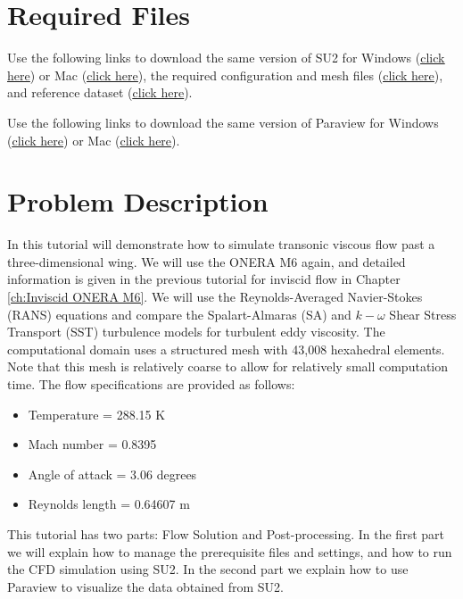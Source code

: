 \section{Required Files}
\begin{su2note}
	Use the following links to download the same version of SU2 for Windows (\href{https://users.encs.concordia.ca/~bvermeir/book/executables/windows/SU2_Windows.zip}{\underline{click here}}) or Mac (\href{https://users.encs.concordia.ca/~bvermeir/book/executables/osx/SU2_Mac.zip}{\underline{click here}}), the required configuration and mesh files (\href{https://gitlab.com/bvermeir/book-cfd/blob/master/tutorial/tut5_turbulent_oneram6/oneram6_turbulent.zip}{\underline{click here}}), and reference dataset (\href{https://gitlab.com/bvermeir/book-cfd/blob/master/tutorial/tut5_turbulent_oneram6/experimental_values.zip}{\underline{click here}}).
\end{su2note}
\begin{paraviewnote}
	Use the following links to download the same version of Paraview for Windows (\href{https://users.encs.concordia.ca/~bvermeir/book/executables/windows/ParaView-5.4.0-Qt5-OpenGL2-Windows-64bit.exe}{\underline{click here}}) or Mac (\href{https://users.encs.concordia.ca/~bvermeir/book/executables/osx/ParaView-5.4.0-Qt5-OpenGL2-MPI-OSX10.8-64bit.dmg}{\underline{click here}}).
\end{paraviewnote}

\section{Problem Description}
In this tutorial will demonstrate how to simulate transonic viscous flow past a three-dimensional wing. We will use the ONERA M6 again, and detailed information is given in the previous tutorial for inviscid flow in Chapter \ref{ch:Inviscid ONERA M6}. We will use the Reynolds-Averaged Navier-Stokes (RANS) equations and compare the Spalart-Almaras (SA) and $k-\omega$ Shear Stress Transport (SST) turbulence models for turbulent eddy viscosity. The computational domain uses a structured mesh with 43,008 hexahedral elements. Note that this mesh is relatively coarse to allow for relatively small computation time. The flow specifications are provided as follows:
\begin{itemize}
    \item Temperature = 288.15 K
    \item Mach number = 0.8395
    \item Angle of attack = 3.06 degrees
    \item Reynolds length = 0.64607 m
\end{itemize}
This tutorial has two parts: Flow Solution and Post-processing. In the first part we will explain how to manage the prerequisite files and settings, and how to run the CFD simulation using SU2. In the second part we explain how to use Paraview to visualize the data obtained from SU2.
